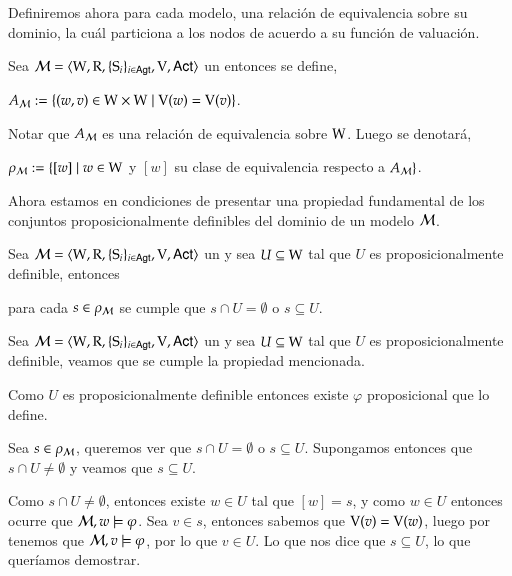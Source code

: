 Definiremos ahora para cada modelo, una relación de equivalencia sobre su dominio, la cuál particiona a los nodos de acuerdo
a su función de valuación.

\begin{definicion}\label{def:A_m}
    Sea $\mathcal{M}=\langle \mathrm{W},\mathrm{R},\{ \mathrm{S}_i \}_{i \in {\rm \sf Agt}},\mathrm{V},{\rm \sf Act} \rangle$ un \ults entonces se define, 
    \begin{center}
        $A_{\mathcal{M}} := \{(w,v) \in \mathrm{W} \times \mathrm{W} \mid \mathrm{V}(w) = \mathrm{V}(v)\}$.
    \end{center}
    Notar que $A_{\mathcal{M}}$ es una relación de equivalencia sobre $\mathrm{W}$. Luego se denotará,
    \begin{center}
        $\rho_{\mathcal{M}} := \{ [w] \mid w \in \mathrm{W} $ y $[w]$ su clase de equivalencia respecto a $A_{\mathcal{M}}\}$.
    \end{center}
\end{definicion}

Ahora estamos en condiciones de presentar una propiedad fundamental de los conjuntos proposicionalmente definibles del dominio de un modelo $\mathcal{M}$.

\begin{lema}\label{lema:propositionally-definable-lemma}
    Sea $\mathcal{M}=\langle \mathrm{W},\mathrm{R},\{ \mathrm{S}_i \}_{i \in {\rm \sf Agt}},\mathrm{V},{\rm \sf Act} \rangle$ un \ults y sea $U \subseteq \mathrm{W}$ tal que $U$ es proposicionalmente definible, entonces
    \begin{center}
        para cada $s \in \rho_{\mathcal{M}}$ se cumple que $s \cap U = \emptyset$ o $s \subseteq U$.
    \end{center}
\end{lema}

\begin{demostracion}
    Sea $\mathcal{M}=\langle \mathrm{W},\mathrm{R},\{ \mathrm{S}_i \}_{i \in {\rm \sf Agt}},\mathrm{V},{\rm \sf Act} \rangle$ un \ults y sea $U \subseteq \mathrm{W}$ tal que $U$ es proposicionalmente definible, 
    veamos que se cumple la propiedad mencionada.

    Como $U$ es proposicionalmente definible entonces existe $\varphi$ proposicional que lo define.

    Sea $s \in \rho_{\mathcal{M}}$, queremos ver que $s \cap U = \emptyset$ o $s \subseteq U$. Supongamos entonces que 
    $s \cap U \neq \emptyset$ y veamos que $s \subseteq U$. 
    
    Como $s \cap U \neq \emptyset$, entonces existe $w \in U$ tal que $[w] = s$, y como $w \in U$ entonces ocurre que 
    $\mathcal{M},w \models \varphi$. Sea $v \in s$, entonces sabemos que $\mathrm{V}(v) = \mathrm{V}(w)$, luego por 
     tenemos que $\mathcal{M},v \models \varphi$, por lo que $v \in U$. Lo que nos dice que 
    $s \subseteq U$, lo que queríamos demostrar.  
\end{demostracion}

